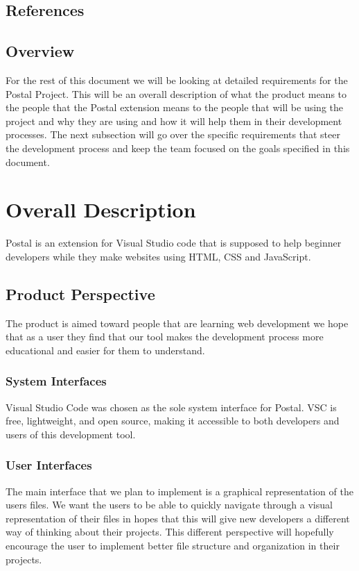 \documentclass[letterpaper,10pt,titlepage,draftclsnofoot,onecolumn,onesided] {IEEEtran}
\begin{document}
\subsection{References}



\subsection{Overview}
For the rest of this document we will be looking at detailed requirements for the Postal Project. 
This will be an overall description of what the product means to the people that the Postal extension means to the people that will be using the project and why they are using and how it will help them in their development processes. The next subsection will go over the specific requirements that steer the development process and keep the team focused on the goals specified in this document.   

\section{Overall Description}
Postal is an extension for Visual Studio code  that is supposed to help beginner developers while they make websites using HTML, CSS and JavaScript.

\subsection{Product Perspective}
The product is aimed toward people that are learning web development we hope that as a user they find that our tool makes the development process more educational and easier for them to understand.

\subsubsection{System Interfaces}
Visual Studio Code was chosen as the sole system interface for Postal. VSC is free, lightweight, and open source, making it accessible to both developers and users of this development tool.

\subsubsection{User Interfaces}
The main interface that we plan to implement is a graphical representation of the users files. 
We want the users to be able to quickly navigate through a visual representation of their files in hopes that this will give new developers a different way of thinking about their projects.
This different perspective will hopefully encourage the user to implement better file structure and organization in their projects.
\end{document}
